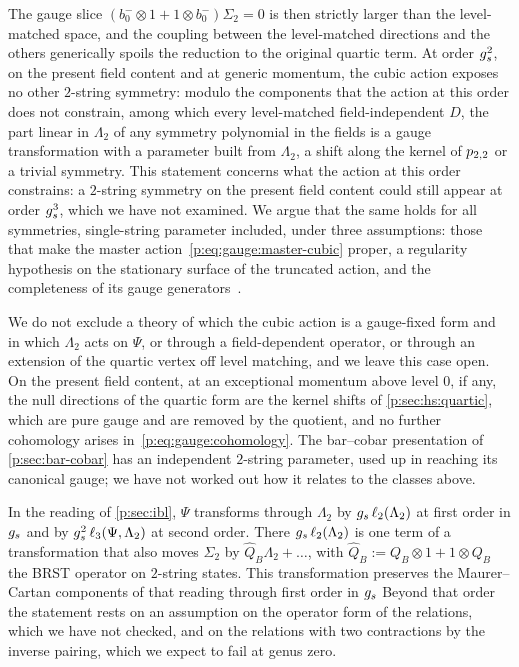   The gauge slice $(b_0^- \otimes 1 + 1 \otimes b_0^-) \Sigma_2 = 0$ is then strictly larger than the level-matched space, and the coupling between the level-matched directions and the others generically spoils the reduction to the original quartic term.
  At order $g_s^2$, on the present field content and at generic momentum, the cubic action exposes no other $2$-string symmetry: modulo the components that the action at this order does not constrain, among which every level-matched field-independent $D$, the part linear in $\Lambda_2$ of any symmetry polynomial in the fields is a gauge transformation with a parameter built from $\Lambda_2$, a shift along the kernel of $p_{2,2}$ or a trivial symmetry.
  This statement concerns what the action at this order constrains: a $2$-string symmetry on the present field content could still appear at order $g_s^3$, which we have not examined.
  We argue that the same holds for all symmetries, single-string parameter included, under three assumptions: those that make the master action~\eqref{p:eq:gauge:master-cubic} proper, a regularity hypothesis on the stationary surface of the truncated action, and the completeness of its gauge generators~\cite{Henneaux:1994:QuantizationGaugeSystems}.



We do not exclude a theory of which the cubic action is a gauge-fixed form and in which $\Lambda_2$ acts on $\Psi$, or through a field-dependent operator, or through an extension of the quartic vertex off level matching, and we leave this case open.
  On the present field content, at an exceptional momentum above level $0$, if any, the null directions of the quartic form are the kernel shifts of \cref{p:sec:hs:quartic}, which are pure gauge and are removed by the quotient, and no further cohomology arises in~\eqref{p:eq:gauge:cohomology}.
The bar--cobar presentation of \cref{p:sec:bar-cobar} has an independent $2$-string parameter, used up in reaching its canonical gauge; we have not worked out how it relates to the classes above.

In the \IBL{} reading of \cref{p:sec:ibl}, $\Psi$ transforms through $\Lambda_2$ by $g_s \, \ell_2(\Lambda_2)$ at first order in $g_s$ and by $g_s^2 \, \ell_3(\Psi, \Lambda_2)$ at second order.
  There $g_s \, \ell_2(\Lambda_2)$ is one term of a transformation that also moves $\Sigma_2$ by $\hat Q_B \Lambda_2 + \dots$, with $\hat Q_B := Q_B \otimes 1 + 1 \otimes Q_B$ the BRST operator on $2$-string states.
  This transformation preserves the Maurer--Cartan components of that reading through first order in $g_s$
  Beyond that order the statement rests on an assumption on the operator form of the relations, which we have not checked, and on the relations with two contractions by the inverse pairing, which we expect to fail at genus zero.

